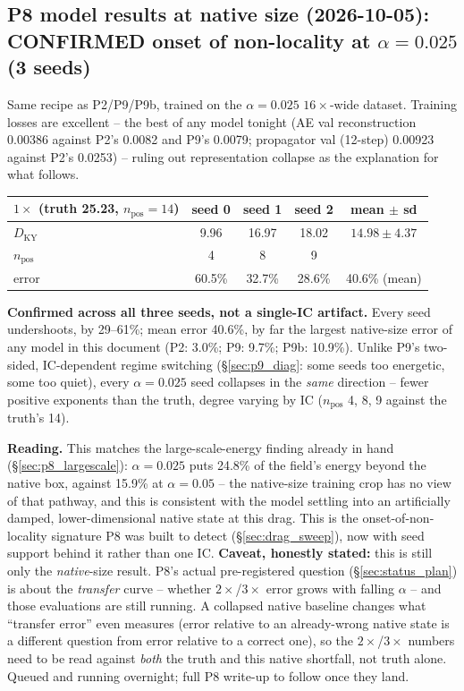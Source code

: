 \documentclass[11pt]{article}
\begin{document}
\subsection{P8 model results at native size (2026-10-05): CONFIRMED
onset of non-locality at $\alpha{=}0.025$ (3 seeds)}
\label{sec:p8_model_first}

Same recipe as P2/P9/P9b, trained on the $\alpha{=}0.025$
$16\times$-wide dataset. Training losses are excellent -- the best of
any model tonight (AE val reconstruction 0.00386 against P2's 0.0082
and P9's 0.0079; propagator val (12-step) 0.00923 against P2's 0.0253)
-- ruling out representation collapse as the explanation for what
follows.

\begin{center}
\small
\begin{tabular}{lcccc}
\toprule
$1\times$ (truth 25.23, $n_{\mathrm{pos}}{=}14$) & seed 0 & seed 1 & seed 2 & mean $\pm$ sd \\
\midrule
$D_{\mathrm{KY}}$ & 9.96 & 16.97 & 18.02 & $14.98\pm4.37$ \\
$n_{\mathrm{pos}}$ & 4 & 8 & 9 & \\
error & 60.5\% & 32.7\% & 28.6\% & 40.6\% (mean) \\
\bottomrule
\end{tabular}
\end{center}

\textbf{Confirmed across all three seeds, not a single-IC artifact.}
Every seed undershoots, by 29--61\%; mean error 40.6\%, by far the
largest native-size error of any model in this document (P2: 3.0\%;
P9: 9.7\%; P9b: 10.9\%). Unlike P9's two-sided, IC-dependent regime
switching (\S\ref{sec:p9_diag}: some seeds too energetic, some too
quiet), every $\alpha{=}0.025$ seed collapses in the \emph{same}
direction -- fewer positive exponents than the truth, degree varying
by IC ($n_{\mathrm{pos}}$ 4, 8, 9 against the truth's 14).

\textbf{Reading.} This matches the large-scale-energy finding already
in hand (\S\ref{sec:p8_largescale}): $\alpha{=}0.025$ puts 24.8\% of
the field's energy beyond the native box, against 15.9\% at
$\alpha{=}0.05$ -- the native-size training crop has no view of that
pathway, and this is consistent with the model settling into an
artificially damped, lower-dimensional native state at this drag. This
is the onset-of-non-locality signature P8 was built to detect
(\S\ref{sec:drag_sweep}), now with seed support behind it rather than
one IC. \textbf{Caveat, honestly stated:} this is still only the
\emph{native}-size result. P8's actual pre-registered question
(\S\ref{sec:status_plan}) is about the \emph{transfer} curve --
whether $2\times$/$3\times$ error grows with falling $\alpha$ -- and
those evaluations are still running. A collapsed native baseline
changes what ``transfer error'' even measures (error relative to an
already-wrong native state is a different question from error
relative to a correct one), so the $2\times$/$3\times$ numbers need to
be read against \emph{both} the truth and this native shortfall, not
truth alone. Queued and running overnight; full P8 write-up to follow
once they land.
\end{document}
